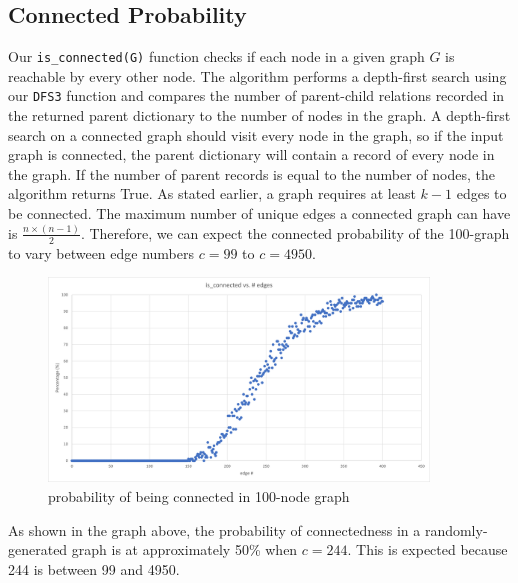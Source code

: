 \documentclass[12pt]{article}
\begin{document}
\subsection{Connected Probability}
Our \verb+is_connected(G)+ function checks if each node in a given graph $G$ is reachable by every other node. The algorithm performs a depth-first search using our \verb+DFS3+ function and compares the number of parent-child relations recorded in the returned parent dictionary to the number of nodes in the graph. A depth-first search on a connected graph should visit every node in the graph, so if the input graph is connected, the parent dictionary will contain a record of every node in the graph. If the number of parent records is equal to the number of nodes, the algorithm returns True. 
As stated earlier, a graph requires at least $k-1$ edges to be connected. The maximum number of unique edges a connected graph can have is $\frac{n\times(n-1)}{2}$. Therefore, we can expect the connected probability of the 100-graph to vary between edge numbers $c=99$ to $c=4950$.
\begin{figure}[H]
\centering
\includegraphics[width=0.9\textwidth,height=\textheight,keepaspectratio]{connected}
\caption{probability of being connected in 100-node graph}
\label{Figure: m2}
\end{figure}
As shown in the graph above, the probability of connectedness in a randomly-generated graph is at approximately 50\% when $c=244$. This is expected because 244 is between 99 and 4950. 
\end{document}
